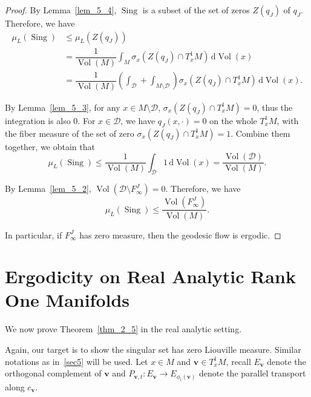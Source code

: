 \documentclass[reqno,11pt]{article}
\theoremstyle{definition}
\theoremstyle{remark}
\numberwithin{equation}{section}
\DeclareMathOperator{\vol}{Vol}
\DeclareMathOperator{\sing}{Sing}
\begin{document}
\begin{proof}
	By Lemma~\ref{lem_5_4}, $\sing$ is a subset of the set of zeros $Z(q_{J})$ of $q_J$. Therefore, we have
	\begin{displaymath}
		\begin{aligned}
			\mu_{L}(\sing) & \leq \mu_{L}(Z(q_{J}))                                                                                                                   \\
			               & =\dfrac{1}{\vol(M)}\int_{M}\sigma_{x}(Z(q_{J})\cap T^{1}_{x}M)\,\mathrm{d}\vol(x)                                                        \\
			               & =\dfrac{1}{\vol(M)}\left(\int_{\mathcal{D}}+\int_{M\setminus \mathcal{D}}\right) \sigma_{x}(Z(q_{J})\cap T^{1}_{x}M)\,\mathrm{d}\vol(x).
		\end{aligned}
	\end{displaymath}

	By Lemma~\ref{lem_5_3}, for any $x\in M\setminus \mathcal{D}$, $\sigma_{x}(Z(q_{J})\cap T^{1}_{x}M)=0$, thus the integration is also $0$. For $x\in \mathcal{D}$, we have $q_{J}(x,\cdot)=0$ on the whole $T^{1}_{x}M$, with the fiber measure of the set of zero $\sigma_{x}(Z(q_{J})\cap T^{1}_{x}M)=1$. Combine them together, we obtain that
	\begin{displaymath}
		\mu_{L}(\sing)\le \dfrac{1}{\vol(M)}\int_{\mathcal{D}}1\,\mathrm{d}\vol(x)=\dfrac{\vol(\mathcal{D})}{\vol(M)}.
	\end{displaymath}

	By Lemma~\ref{lem_5_2}, $\vol(\mathcal{D}\setminus F^{J}_{\infty})=0$. Therefore, we have
	\begin{displaymath}
		\mu_{L}(\sing)\leq\dfrac{\vol(F^{J}_{\infty})}{\vol(M)}.
	\end{displaymath}

	In particular, if $F^{J}_{\infty}$ has zero measure, then the geodesic flow is ergodic.
\end{proof}

\section{Ergodicity on Real Analytic Rank One Manifolds}\label{sec6}
We now prove Theorem~\ref{thm_2_5} in the real analytic setting.

\analymlfd*

Again, our target is to show the singular set has zero Liouville measure. Similar notations as in~\ref{sec5} will be used. Let $x\in M$ and $\bm{v}\in T^{1}_{x}M$, recall $E_{\bm{v}}$ denote the orthogonal complement of $\bm{v}$ and $P_{\bm{v},t}:E_{\bm{v}}\to E_{\phi_{t}(\bm{v})}$ denote the parallel transport along $c_{\bm{v}}$.
\end{document}
